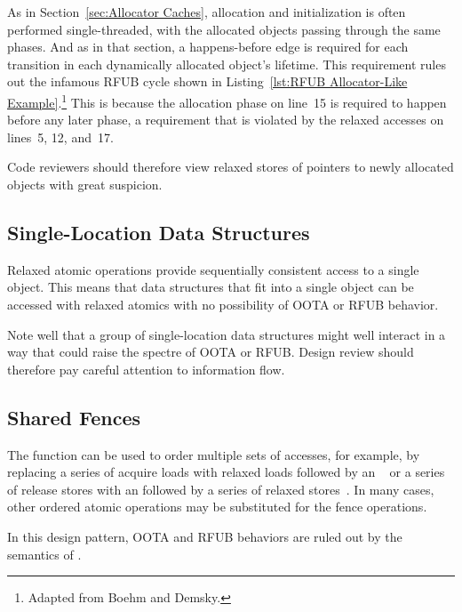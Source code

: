 \documentclass[10]{article}
\begin{document}
As in
Section~\ref{sec:Allocator Caches},
allocation and initialization is often performed single-threaded,
with the allocated objects passing through the same phases.
And as in that section, a happens-before edge is required for each
transition in each dynamically allocated object's lifetime.
This requirement rules out the infamous RFUB cycle shown in
Listing~\ref{lst:RFUB Allocator-Like Example}.\footnote{
	Adapted from Boehm and
	Demsky\cite[Figure 5]{Boehm:2014:OGA:2618128.2618134}.}
This is because the allocation phase on line~15 is required to happen
before any later phase, a requirement that is violated by the relaxed
accesses on lines~5, 12, and~17.

Code reviewers should therefore view relaxed stores of pointers to
newly allocated objects with great suspicion.

\subsection{Single-Location Data Structures}
\label{sec:Single-Location Data Structures}

Relaxed atomic operations provide sequentially consistent access to
a single object.
This means that data structures that fit into a single object can
be accessed with relaxed atomics with no possibility of OOTA or
RFUB behavior.

Note well that a group of single-location data structures might well
interact in a way that could raise the spectre of OOTA or RFUB.
Design review should therefore pay careful attention to information
flow.

\subsection{Shared Fences}
\label{sec:Shared Fences}

The  function can be used to order
multiple sets of accesses, for example, by replacing a series of
acquire loads with relaxed loads followed by an
~\cite[Section 4.1]{RaulSilvera2007WeakMemoryModel}
or a series of release stores with an
 followed by
a series of relaxed stores~\cite[Section 4.2]{RaulSilvera2007WeakMemoryModel}.
In many cases, other ordered atomic operations may be substituted for
the fence operations.

In this design pattern, OOTA and RFUB behaviors are ruled out by the semantics
of .
\end{document}
